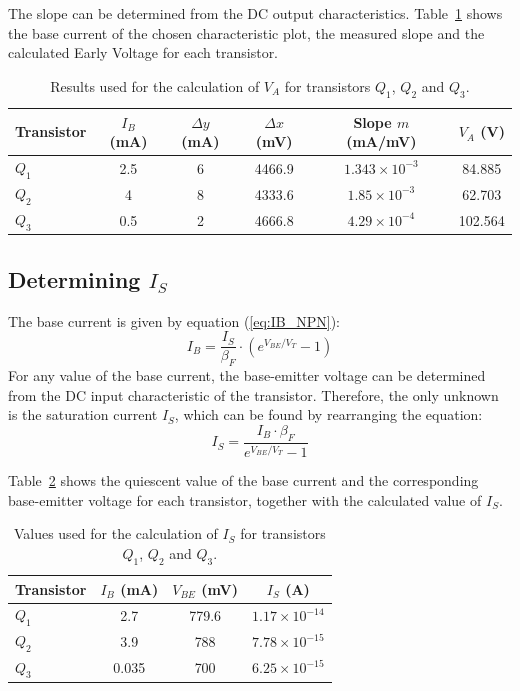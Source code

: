 \documentclass[12pt,a4paper]{article}
\begin{document}
The slope can be determined from the DC output characteristics. Table~\ref{tab:VA} shows the base
current of the chosen characteristic plot, the measured slope and the calculated Early Voltage for
each transistor.

\begin{table}[H]
    \centering
    \begin{tabular}{lccccc}
        \toprule
        Transistor & $I_B$ (mA) & $\Delta y$ (mA) & $\Delta x$ (mV) & Slope $m$ (mA/mV) & $V_A$ (V) \\
        \midrule
        $Q_1$ & 2.5 & 6& 4466.9& $1.343\times10^{-3}$& 84.885\\
        $Q_2$ & 4   & 8& 4333.6& $1.85\times10^{-3}$& 62.703\\
        $Q_3$ & 0.5 & 2& 4666.8& $4.29\times10^{-4}$& 102.564\\
        \bottomrule
    \end{tabular}
    \caption{Results used for the calculation of $V_A$ for transistors $Q_1$, $Q_2$ and $Q_3$.}
    \label{tab:VA}
\end{table}

\subsection{Determining $I_S$}

The base current is given by equation (\ref{eq:IB_NPN}):
\[
    I_B = \frac{I_S}{\beta_F} \cdot \left(e^{V_{BE}/V_T} - 1\right)
\]
For any value of the base current, the base-emitter voltage can be determined from the DC input
characteristic of the transistor. Therefore, the only unknown is the saturation current $I_S$,
which can be found by rearranging the equation:
\begin{equation}
    I_S = \frac{I_B \cdot \beta_F}{e^{V_{BE}/V_T} - 1}
    \label{eq:IS}
\end{equation}

Table~\ref{tab:IS} shows the quiescent value of the base current and the corresponding
base-emitter voltage for each transistor, together with the calculated value of $I_S$.

\begin{table}[H]
    \centering
    \begin{tabular}{lccc}
        \toprule
        Transistor & $I_B$ (mA) & $V_{BE}$ (mV) & $I_S$ (A) \\
        \midrule
        $Q_1$ & 2.7   & 779.6& $1.17\times10^{-14}$\\
        $Q_2$ & 3.9   & 788& $7.78\times10^{-15}$\\
        $Q_3$ & 0.035 & 700& $6.25\times10^{-15}$\\
        \bottomrule
    \end{tabular}
    \caption{Values used for the calculation of $I_S$ for transistors $Q_1$, $Q_2$ and $Q_3$.}
    \label{tab:IS}
\end{table}
\end{document}
